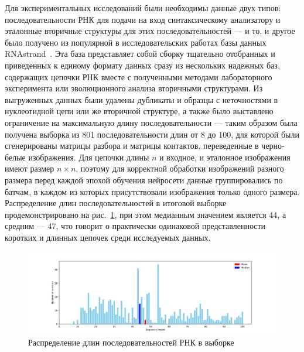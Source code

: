Для экспериментальных исследований были необходимы данные двух типов: последовательности РНК для подачи на вход синтаксическому анализатору и эталонные вторичные структуры для этих последовательностей --- и то, и другое было получено из популярной в исследовательских работах базы данных RNAstrand~\cite{andronescu2008rna}. Эта база представляет собой сборку тщательно отобранных и приведенных к единому формату данных сразу из нескольких надежных баз, содержащих цепочки РНК вместе с полученными методами лабораторного эксперимента или эволюционного анализа вторичными структурами. Из выгруженных данных были удалены дубликаты и образцы с неточностями в нуклеотидной цепи или же вторичной структуре, а также было выставлено ограничение на максимальную длину последовательности --- таким образом была получена выборка из 801 последовательности длин от 8 до 100, для которой были сгенерированы матрицы разбора и матрицы контактов, переведенные в черно-белые изображения. Для цепочки длины $n$ и входное, и эталонное изображения имеют размер $n \times n$, поэтому для корректной обработки изображений разного размера перед каждой эпохой обучения нейросети данные группировались по батчам, в каждом из которых присутствовали изображения только одного размера. Распределение длин последовательностей в итоговой выборке продемонстрировано на рис.~\ref{plot_distr}, при этом медианным значением является 44, а средним --- 47, что говорит о практически одинаковой представленности коротких и длинных цепочек среди исследуемых данных.

\begin{figure}[h]
\begin{center}
\centering
\includegraphics[width=16cm]{pics/plot_distr.png}
\caption{Распределение длин последовательностей РНК в выборке}
\label{plot_distr}
\end{center}
\end{figure} 

